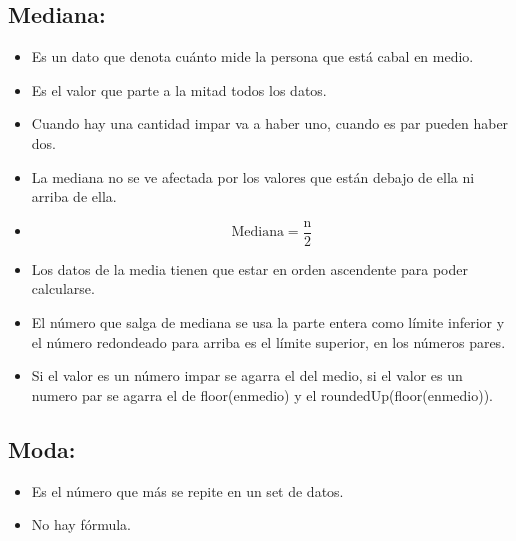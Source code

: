 \subsection{Mediana:}
\begin{itemize}
    \item Es un dato que denota cuánto mide la persona que está cabal en medio.
    \item Es el valor que parte a la mitad todos los datos.
    \item Cuando hay una cantidad impar va a haber uno, cuando es par pueden haber dos.
    \item La mediana no se ve afectada por los valores que están debajo de ella ni arriba de ella.
    \item \[
      \text{Mediana} = \frac{\text{n}}{2} 
    \]
    
    \item Los datos de la media tienen que estar en orden ascendente para poder calcularse.
    \item El número que salga de mediana se usa la parte entera como límite inferior y el número redondeado para arriba es el límite superior, en los números pares.
    \item Si el valor es un número impar se agarra el del medio, si el valor es un numero par se agarra el de floor(enmedio) y el roundedUp(floor(enmedio)).
\end{itemize}

\subsection{Moda:}
\begin{itemize}
    \item Es el número que más se repite en un set de datos.
    \item No hay fórmula.
\end{itemize}


